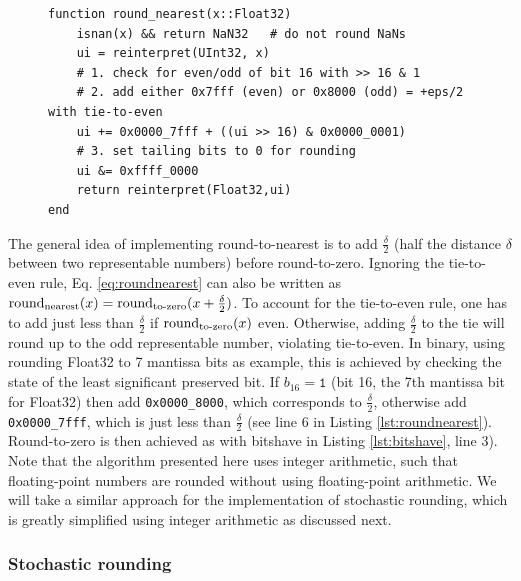 \begin{figure}[tbhp]
\begin{lstlisting}[language=JuliaLocal, label=lst:roundnearest, caption={\textbf{Efficient round-to-nearest implemented with integer arithmetic.}
Example algorithm rounding Float32 to 7 mantissa bits as in Listing \ref{lst:bitshave}. Algorithm adapted from the open-source package
\href{https://github.com/milankl/BFloat16s.jl}{BFloat16s.jl}}]
function round_nearest(x::Float32)
    isnan(x) && return NaN32   # do not round NaNs
    ui = reinterpret(UInt32, x)
    # 1. check for even/odd of bit 16 with >> 16 & 1
    # 2. add either 0x7fff (even) or 0x8000 (odd) = +eps/2 with tie-to-even
    ui += 0x0000_7fff + ((ui >> 16) & 0x0000_0001)
    # 3. set tailing bits to 0 for rounding
    ui &= 0xffff_0000
    return reinterpret(Float32,ui)
end
\end{lstlisting}
\end{figure}
The general idea of implementing round-to-nearest is to add $\tfrac{\delta}{2}$ (half the distance $\delta$ between two representable numbers) before round-to-zero.
Ignoring the tie-to-even rule, Eq. \ref{eq:roundnearest} can also be written as $\operatorname{round}_{\operatorname{nearest}}(x) = \operatorname{round}_{\operatorname{to-zero}}(x + \tfrac{\delta}{2})$.
To account for the tie-to-even rule, one has to add just less than $\tfrac{\delta}{2}$ if $\operatorname{round}_{\operatorname{to-zero}}(x)$ even. Otherwise, adding $\tfrac{\delta}{2}$
to the tie will round up to the odd representable number, violating tie-to-even. In binary, using rounding Float32 to 7 mantissa bits as example, this is achieved
by checking the state of the least significant preserved bit. If $b_{16} = \mathtt{1}$ (bit 16, the 7th mantissa bit for Float32) then add \texttt{0x0000\_8000},
which corresponds to $\tfrac{\delta}{2}$, otherwise add \texttt{0x0000\_7fff}, which is just less than $\tfrac{\delta}{2}$ (see line 6 in Listing \ref{lst:roundnearest}).
Round-to-zero is then achieved as with bitshave in Listing \ref{lst:bitshave}, line 3). Note that the algorithm presented here uses integer arithmetic, such that
floating-point numbers are rounded without using floating-point arithmetic. We will take a similar approach for the implementation of stochastic rounding,
which is greatly simplified using integer arithmetic as discussed next.

\subsubsection{Stochastic rounding}

